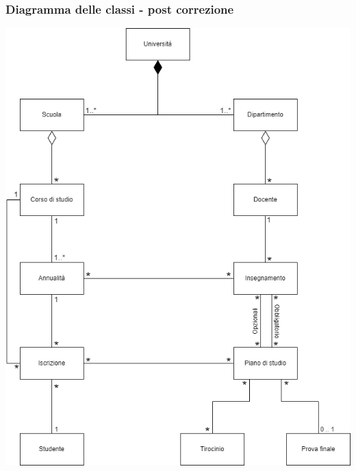 \documentclass{article}
\begin{document}
\subsubsection*{Diagramma delle classi - post correzione}
\large
\vspace*{27pt}
\begin{center}
    \includegraphics[width=1.02\textwidth]{foto 3.png}
\end{center}
\pagebreak
\end{document}
